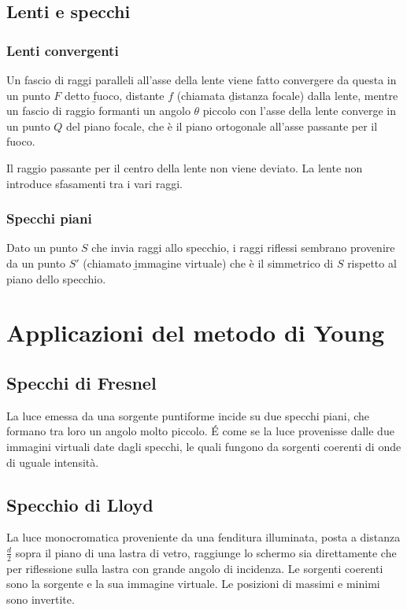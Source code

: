 \subsection{Lenti e specchi}
\subsubsection{Lenti convergenti}
Un fascio di raggi paralleli all'asse della lente viene fatto convergere da questa in un punto $F$ detto \b{fuoco}, distante $f$ (chiamata \b{distanza focale}) dalla lente, mentre un fascio di raggio formanti un angolo $\theta$ piccolo con l'asse della lente converge in un punto $Q$ del piano focale, che è il piano ortogonale all'asse passante per il fuoco.

Il raggio passante per il centro della lente non viene deviato. La lente non introduce sfasamenti tra i vari raggi.

\subsubsection{Specchi piani}
Dato un punto $S$ che invia raggi allo specchio, i raggi riflessi sembrano provenire da un punto $S'$ (chiamato \b{immagine virtuale}) che è il simmetrico di $S$ rispetto al piano dello specchio.

\section{Applicazioni del metodo di Young}%

\subsection{Specchi di Fresnel}
La luce emessa da una sorgente puntiforme incide su due specchi piani, che formano tra loro un angolo molto piccolo. \'E come se la luce provenisse dalle due immagini virtuali date dagli specchi, le quali fungono da sorgenti coerenti di onde di uguale intensità.

\subsection{Specchio di Lloyd}
La luce monocromatica proveniente da una fenditura illuminata, posta a distanza $\frac{d}{2}$ sopra il piano di una lastra di vetro, raggiunge lo schermo sia direttamente che per riflessione sulla lastra con grande angolo di incidenza. Le sorgenti coerenti sono la sorgente e la sua immagine virtuale. Le posizioni di massimi e minimi sono invertite.

